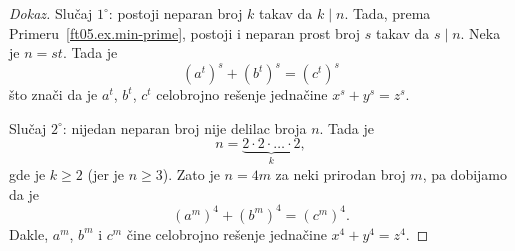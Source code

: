 \begin{proof}[Dokaz]
  \medskip
  
  Slu\v caj $1^\circ$: postoji neparan broj $k$ takav da $k \mid n$. Tada, prema Primeru~\ref{ft05.ex.min-prime},
  postoji i neparan prost broj $s$ takav da $s \mid n$. Neka je $n = st$. Tada je
  $$
    (a^t)^s + (b^t)^s = (c^t)^s
  $$
  \v sto zna\v ci da je $a^t$, $b^t$, $c^t$ celobrojno re\v senje jedna\v cine $x^s + y^s = z^s$.

  \medskip

  Slu\v caj $2^\circ$: nijedan neparan broj nije delilac broja $n$. Tada je
  $$
    n = \underbrace{2 \cdot 2 \cdot \ldots \cdot 2}_k,
  $$
  gde je $k \ge 2$ (jer je $n \ge 3$). Zato je $n = 4m$ za neki prirodan broj $m$, pa dobijamo da je
  $$
    (a^m)^4 + (b^m)^4 = (c^m)^4.
  $$
  Dakle, $a^m$, $b^m$ i $c^m$ \v cine celobrojno re\v senje jedna\v cine $x^4 + y^4 = z^4$.
\end{proof}


